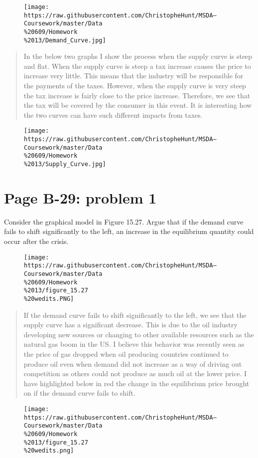 \documentclass[]{article}
\begin{document}
\begin{figure}[htbp]
\centering
\texttt{[image: https://raw.githubusercontent.com/ChristopheHunt/MSDA---Coursework/master/Data\\\%20609/Homework\\\%2013/Demand\_Curve.jpg]}
\caption{}
\end{figure}

\newpage

\begin{quote}
In the below two graphs I show the process when the supply curve is
steep and flat. When the supply curve is steep a tax increase causes the
price to increase very little. This means that the industry will be
responsible for the payments of the taxes. However, when the supply
curve is very steep the tax increase is fairly close to the price
increase. Therefore, we see that the tax will be covered by the consumer
in this event. It is interesting how the two curves can have such
different impacts from taxes.
\end{quote}

\begin{figure}[htbp]
\centering
\texttt{[image: https://raw.githubusercontent.com/ChristopheHunt/MSDA---Coursework/master/Data\\\%20609/Homework\\\%2013/Supply\_Curve.jpg]}
\caption{}
\end{figure}

\newpage

\section{Page B-29: problem 1}\label{page-b-29-problem-1}

Consider the graphical model in Figure 15.27. Argue that if the demand
curve fails to shift significantly to the left, an increase in the
equilibrium quantity could occur after the crisis.

\begin{figure}[htbp]
\centering
\texttt{[image: https://raw.githubusercontent.com/ChristopheHunt/MSDA---Coursework/master/Data\\\%20609/Homework\\\%2013/figure\_15.27\\\%20wedits.PNG]}
\caption{}
\end{figure}

\begin{quote}
If the demand curve fails to shift significantly to the left, we see
that the supply curve has a significant decrease. This is due to the oil
industry developing new sources or changing to other available resources
such as the natural gas boom in the US. I believe this behavior was
recently seen as the price of gas dropped when oil producing countries
continued to produce oil even when demand did not increase as a way of
driving out competition as others could not produce as much oil at the
lower price. I have highlighted below in red the change in the
equilibrium price brought on if the demand curve fails to shift.
\end{quote}

\begin{figure}[htbp]
\centering
\texttt{[image: https://raw.githubusercontent.com/ChristopheHunt/MSDA---Coursework/master/Data\\\%20609/Homework\\\%2013/figure\_15.27\\\%20wedits.png]}
\caption{}
\end{figure}
\end{document}
